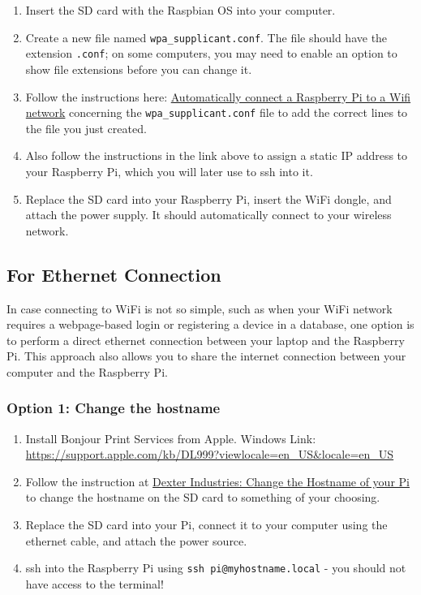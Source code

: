 \documentclass{article}
\begin{document}
	 \begin{enumerate}
	 	\item Insert the SD card with the Raspbian OS into your computer.
	 	\item Create a new file named \verb|wpa_supplicant.conf|. The file should have the extension \verb|.conf|; on some computers, you may need to enable an option to show file extensions before you can change it.
	 	\item Follow the instructions here: \href{http://weworkweplay.com/play/automatically-connect-a-raspberry-pi-to-a-wifi-network/}{Automatically connect a Raspberry Pi to a Wifi network} concerning the \verb|wpa_supplicant.conf| file to add the correct lines to the file you just created.
	 	\item Also follow the instructions in the link above to assign a static IP address to your Raspberry Pi, which you will later use to ssh into it.
	 	\item Replace the SD card into your Raspberry Pi, insert the WiFi dongle, and attach the power supply. It should automatically connect to your wireless network.
	 \end{enumerate}
	
	\subsection{For Ethernet Connection}
	In case connecting to WiFi is not so simple, such as when your WiFi network requires a webpage-based login or registering a device in a database, one option is to perform a direct ethernet connection between your laptop and the Raspberry Pi. This approach also allows you to share the internet connection between your computer and the Raspberry Pi.
	
	\subsubsection{Option 1: Change the hostname}
	\begin{enumerate}
		\item Install Bonjour Print Services from Apple.
		\subitem Windows Link: \url{https://support.apple.com/kb/DL999?viewlocale=en_US&locale=en_US}
		\item Follow the instruction at \href{http://www.dexterindustries.com/howto/change-the-hostname-of-your-pi/}{Dexter Industries: Change the Hostname of your Pi} to change the hostname on the SD card to something of your choosing.
		\item Replace the SD card into your Pi, connect it to your computer using the ethernet cable, and attach the power source.
		\item ssh into the Raspberry Pi using \verb|ssh pi@myhostname.local| - you should not have access to the terminal!

	\end{enumerate}
	
\end{document}
